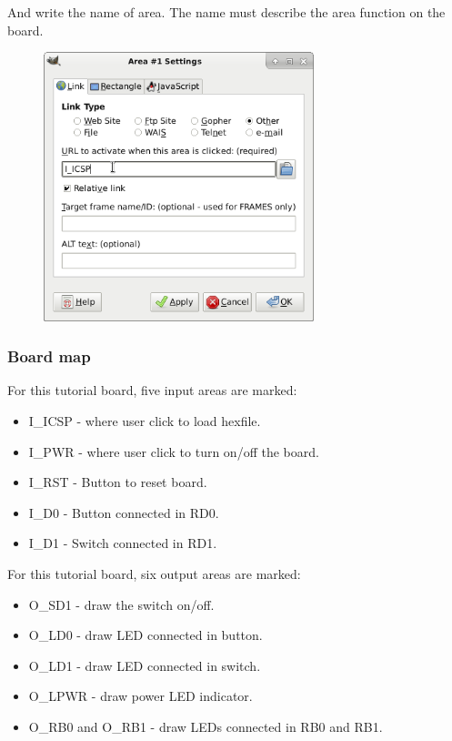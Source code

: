 And write the name of area. The name must describe the area function on the board.
\begin{figure}[H]
\center
\includegraphics[width=0.7\textwidth]{img/hb/gimp05.png} 
\end{figure} 


\subsubsection{Board map}

For this tutorial board, five input areas are marked:
\begin{itemize}
\item I\_ICSP - where user click to load hexfile.
\item I\_PWR - where user click to turn on/off the board.
\item I\_RST - Button to reset board.
\item I\_D0 - Button connected in RD0. 
\item I\_D1 - Switch connected in RD1.
\end{itemize}

For this tutorial board, six output areas are marked:
\begin{itemize}
\item O\_SD1 - draw the switch on/off.
\item O\_LD0 - draw LED connected in button.
\item O\_LD1 - draw LED connected in switch.
\item O\_LPWR - draw power LED indicator.
\item O\_RB0 and O\_RB1 - draw LEDs connected in RB0 and RB1.
\end{itemize}


